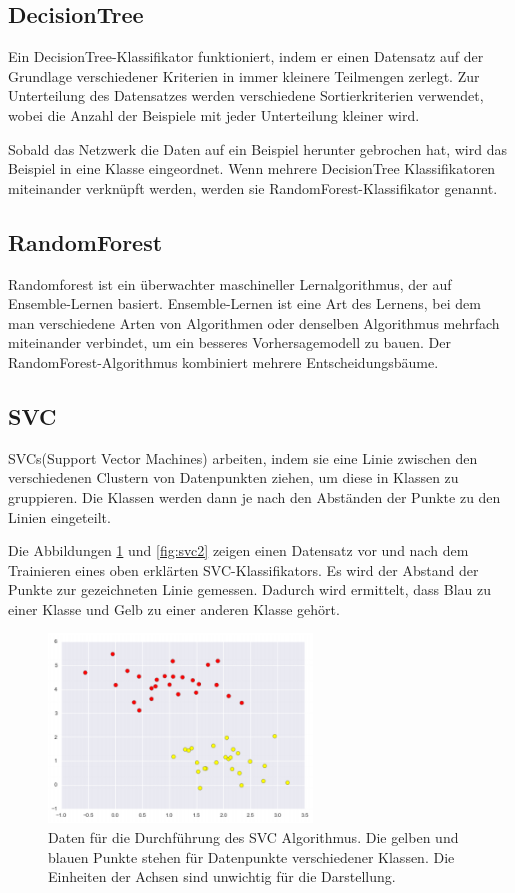 \subsection{DecisionTree}
Ein DecisionTree-Klassifikator funktioniert, indem er einen Datensatz auf der Grundlage verschiedener Kriterien in immer kleinere Teilmengen zerlegt. Zur Unterteilung des Datensatzes werden verschiedene Sortierkriterien verwendet, wobei die Anzahl der Beispiele mit jeder Unterteilung kleiner wird.

Sobald das Netzwerk die Daten auf ein Beispiel herunter gebrochen hat, wird das Beispiel in eine Klasse eingeordnet. Wenn mehrere DecisionTree Klassifikatoren miteinander verknüpft werden, werden sie RandomForest-Klassifikator genannt.


\subsection{RandomForest}
Randomforest ist ein überwachter maschineller Lernalgorithmus, der auf Ensemble-Lernen basiert. Ensemble-Lernen ist eine Art des Lernens, bei dem man verschiedene Arten von Algorithmen oder denselben Algorithmus mehrfach miteinander verbindet, um ein besseres Vorhersagemodell zu bauen. Der RandomForest-Algorithmus kombiniert mehrere Entscheidungsbäume.
\clearpage

\subsection{SVC}
SVCs(Support Vector Machines) arbeiten, indem sie eine Linie zwischen den verschiedenen Clustern von Datenpunkten ziehen, um diese in Klassen zu gruppieren. Die Klassen werden dann je nach den Abständen der Punkte zu den Linien eingeteilt.

Die Abbildungen \ref{fig:svc1} und  \ref{fig:svc2} zeigen einen Datensatz vor und nach dem Trainieren eines oben erklärten SVC-Klassifikators. Es wird der Abstand der  Punkte zur gezeichneten Linie gemessen. Dadurch wird ermittelt, dass Blau  zu einer Klasse und Gelb  zu einer anderen Klasse gehört.



\begin{figure}[H]
  \centering
  \includegraphics[width=70mm,scale=0.7]{SVC1.png}
  \caption{Daten für die Durchführung des SVC Algorithmus. Die gelben und blauen Punkte stehen für Datenpunkte verschiedener Klassen. Die Einheiten der Achsen sind unwichtig für die Darstellung. \cite{10.5555/3133359}}
  \label{fig:svc1}
\end{figure}

